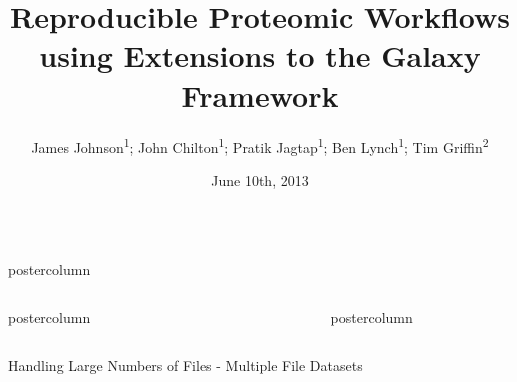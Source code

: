 \documentclass[final,poster]{beamer}
\title{\huge Reproducible Proteomic Workflows using Extensions to the Galaxy Framework}
\author[Johnson, Chilton, et al]{James Johnson\textsuperscript{1}; John Chilton\textsuperscript{1}; Pratik Jagtap\textsuperscript{1}; Ben Lynch\textsuperscript{1}; Tim Griffin\textsuperscript{2}}
\institute[]{\textsuperscript{1}University of Minnesota Supcomputing Institute; \textsuperscript{2}University of Minnesota }
\date{June 10th, 2013}
\newlength{\columnheight}
\newlength{\innercolheight}
\begin{document}
  \begin{frame}
    \begin{columns}
      \begin{column}{.67\textwidth}
        \begin{beamercolorbox}[center,wd=\textwidth]{postercolumn}
          \begin{minipage}[T]{.98\textwidth}  %
            \parbox[t][\columnheight]{\textwidth}{
              \begin{columns}
                \begin{column}{.39\textwidth}
                  \begin{beamercolorbox}[center,wd=\textwidth]{postercolumn}
                    \begin{minipage}[T]{\textwidth} %
                      \parbox[t][\innercolheight]{\textwidth}{
                        \introblock
                        \vfill
                        \galaxypblock
                        \vfill
                        \galaxypcloudblock
                        \vfill
                      }
                    \end{minipage}
                  \end{beamercolorbox}
                \end{column}
                \begin{column}{.01\textwidth}
                \hfill
                \end{column}
                \begin{column}{.60\textwidth}
                  \begin{beamercolorbox}[center,wd=\textwidth]{postercolumn}
                    \begin{minipage}[T]{\textwidth} %
                      \parbox[t][\innercolheight]{\textwidth}{
                        \manyfileschallengesblock
                        \vfill
                        \jgalaxyblock
                        \vfill
                        \toolextensionsblock
                        \vfill
                      }
                    \end{minipage}
                  \end{beamercolorbox}
                \end{column}      
              \end{columns}
              \vfill
              \begin{block}{Handling Large Numbers of Files - Multiple File Datasets}

\end{block}}
\end{minipage}
\end{beamercolorbox}
\end{column}
\end{columns}
\end{frame}
\end{document}
